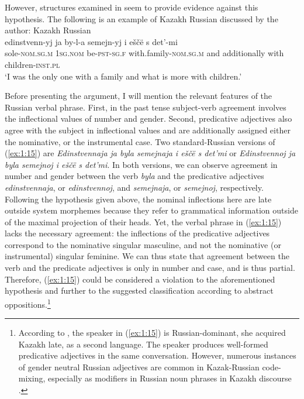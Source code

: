 However, structures examined in \citet{muhamedowa-untersuchung-2006} seem to provide evidence against this hypothesis. The following is an example of Kazakh Russian discussed by the author:
\ea \label{ex:1:15}
Kazakh Russian \citep[92]{muhamedowa-untersuchung-2006}\\
\gll edinstvenn-yj ja by-l-a semejn-yj i eščë s det'-mi\\
	sole-\textsc{nom.sg.m} \textsc{1sg.nom} be-\textsc{pst-sg.f} with.family-\textsc{nom.sg.m} and additionally with children-\textsc{inst.pl}\\
\glt `I was the only one with a family and what is more with children.'
\z

\noindent Before presenting the argument, I will mention the relevant features of the Russian verbal phrase. First, in the past tense subject-verb agreement involves the inflectional values of number and gender. Second, predicative adjectives also agree with the subject in inflectional values and are additionally assigned either the nominative, or the instrumental case. Two standard-Russian versions of (\ref{ex:1:15}) are \textit{Edinstvennaja ja byla semejnaja i eščë s det'mi} or \textit{Edinstvennoj ja byla semejnoj i eščë s det'mi}.  In both versions, we can observe agreement in number and gender between the verb \textit{byla} and the predicative adjectives \textit{edinstvennaja}, or \textit{edinstvennoj}, and \textit{semejnaja}, or \textit{semejnoj}, respectively. Following the hypothesis given above, the nominal inflections here are late outside system morphemes because they refer to grammatical information outside of the maximal projection of their heads. Yet, the verbal phrase in (\ref{ex:1:15}) lacks the necessary agreement: the inflections of the predicative adjectives correspond to the nominative singular masculine, and not the nominative (or instrumental) singular feminine. We can thus state that agreement between the verb and the predicate adjectives is only in number and case, and is thus partial. Therefore, (\ref{ex:1:15}) could be considered a violation to the aforementioned hypothesis and further to the suggested classification according to abstract oppositions.\footnote{According to \citet[92]{muhamedowa-untersuchung-2006}, the speaker in (\ref{ex:1:15}) is Russian-dominant, she acquired Kazakh late, as a second language. The speaker produces well-formed predicative adjectives in the same conversation. However, numerous instances of gender neutral Russian adjectives are common in Kazak-Russian code-mixing, especially as modifiers in Russian noun phrases in Kazakh discourse \citep[cf.][77--93]{muhamedowa-untersuchung-2006}.}


